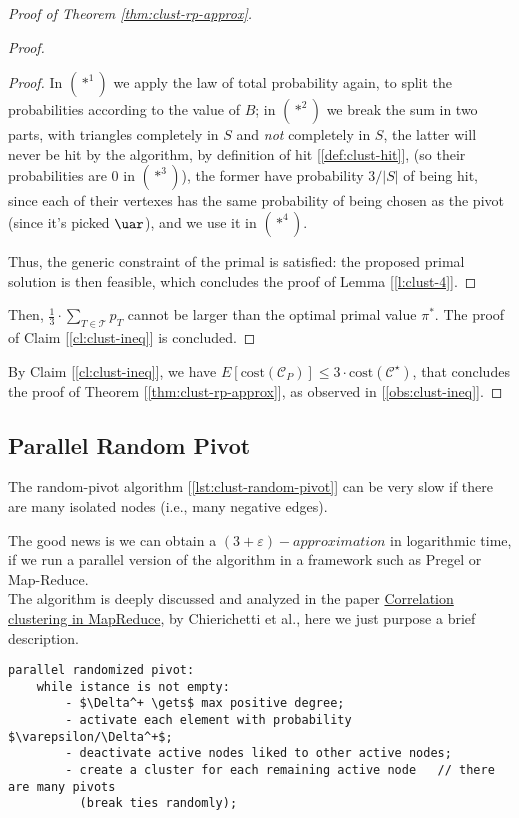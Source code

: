 \begin{proof}[Proof of Theorem \ref{thm:clust-rp-approx}]
\begin{proof}
\begin{proof}
            In $(*^1)$ we apply the law of total probability again, to split the probabilities according to the value of $B$; in $(*^2)$ we break the sum in two parts, with triangles completely in $S$ and \textit{not} completely in $S$, the latter will never be hit by the algorithm, by definition of hit [\ref{def:clust-hit}], (so their probabilities are 0 in $(*^3)$), the former have probability $3/|S|$ of being hit, since each of their vertexes has the same probability of being chosen as the pivot (since it's picked $\uar$), and we use it in $(*^4)$.
            
            Thus, the generic constraint of the primal is satisfied: the proposed primal solution is then feasible, which concludes the proof of Lemma [\ref{l:clust-4}].
        \end{proof}
        
        Then, $\frac13 \cdot \sum_{T \in \mathscr{T}} p_T$ cannot be larger than the optimal primal value $\pi^*$. The proof of Claim [\ref{cl:clust-ineq}] is concluded.
    \end{proof}
    
    By Claim [\ref{cl:clust-ineq}], we have
    $E[\text{cost}(\mathscr{C}_P)] \le 3 \cdot \text{cost}(\mathscr{C}^{\star})$, that concludes the proof of Theorem [\ref{thm:clust-rp-approx}], as observed in [\ref{obs:clust-ineq}].
\end{proof}    


\subsection{Parallel Random Pivot}

\obs The random-pivot algorithm [\ref{lst:clust-random-pivot}] can be very slow if there are many isolated nodes (i.e., many negative edges).

The good news is we can obtain a $(3+\varepsilon)-approximation$ in logarithmic time, if we run a parallel version of the algorithm in a framework such as Pregel or Map-Reduce.\\
The algorithm is deeply discussed and analyzed in the paper \href{https://dl.acm.org/citation.cfm?id=2623743}{Correlation clustering in MapReduce}, by Chierichetti et al., here we just purpose a brief description.

\begin{lstlisting}[caption={Parallel Randomized Pivot}, label={lst:parallel-random-pivot}]
parallel randomized pivot:
    while istance is not empty:
        - $\Delta^+ \gets$ max positive degree;
        - activate each element with probability $\varepsilon/\Delta^+$;
        - deactivate active nodes liked to other active nodes;
        - create a cluster for each remaining active node   // there are many pivots
          (break ties randomly);
\end{lstlisting}

